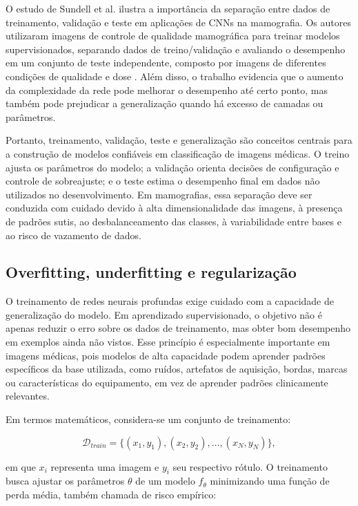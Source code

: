 \documentclass[
    12pt,
    openright,
    oneside,
    a4paper,
    english,
    brazil
]{abntex2}
\begin{document}
O estudo de Sundell et al. ilustra a importância da separação entre dados de treinamento, validação e teste em aplicações de CNNs na mamografia. Os autores utilizaram imagens de controle de qualidade mamográfica para treinar modelos supervisionados, separando dados de treino/validação e avaliando o desempenho em um conjunto de teste independente, composto por imagens de diferentes condições de qualidade e dose \cite{sundell2022cnn}. Além disso, o trabalho evidencia que o aumento da complexidade da rede pode melhorar o desempenho até certo ponto, mas também pode prejudicar a generalização quando há excesso de camadas ou parâmetros.

Portanto, treinamento, validação, teste e generalização são conceitos centrais para a construção de modelos confiáveis em classificação de imagens médicas. O treino ajusta os parâmetros do modelo; a validação orienta decisões de configuração e controle de sobreajuste; e o teste estima o desempenho final em dados não utilizados no desenvolvimento. Em mamografias, essa separação deve ser conduzida com cuidado devido à alta dimensionalidade das imagens, à presença de padrões sutis, ao desbalanceamento das classes, à variabilidade entre bases e ao risco de vazamento de dados.

\subsection{Overfitting, underfitting e regularização}
\label{subsec:aumento_regularizacao_overfitting}

O treinamento de redes neurais profundas exige cuidado com a capacidade de generalização do modelo. Em aprendizado supervisionado, o objetivo não é apenas reduzir o erro sobre os dados de treinamento, mas obter bom desempenho em exemplos ainda não vistos. Esse princípio é especialmente importante em imagens médicas, pois modelos de alta capacidade podem aprender padrões específicos da base utilizada, como ruídos, artefatos de aquisição, bordas, marcas ou características do equipamento, em vez de aprender padrões clinicamente relevantes.

Em termos matemáticos, considera-se um conjunto de treinamento:

\[
\mathcal{D}_{train} = \{(x_1,y_1),(x_2,y_2),\ldots,(x_N,y_N)\},
\]

em que \(x_i\) representa uma imagem e \(y_i\) seu respectivo rótulo. O treinamento busca ajustar os parâmetros \(\theta\) de um modelo \(f_{\theta}\) minimizando uma função de perda média, também chamada de risco empírico:
\end{document}
